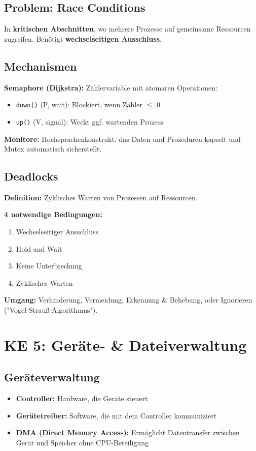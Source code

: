\documentclass[9pt,a4paper]{extarticle}
\begin{document}
\begin{multicols*}{2}
\subsection{Problem: Race Conditions}
In \textbf{kritischen Abschnitten}, wo mehrere Prozesse auf gemeinsame Ressourcen zugreifen. Benötigt \textbf{wechselseitigen Ausschluss}.

\subsection{Mechanismen}
\textbf{Semaphore (Dijkstra):} Zählervariable mit atomaren Operationen:
\begin{itemize}
\item \texttt{down()} (P, wait): Blockiert, wenn Zähler $\leq$ 0
\item \texttt{up()} (V, signal): Weckt ggf. wartenden Prozess
\end{itemize}

\textbf{Monitore:} Hochsprachenkonstrukt, das Daten und Prozeduren kapselt und Mutex automatisch sicherstellt.

\subsection{Deadlocks}
\textbf{Definition:} Zyklisches Warten von Prozessen auf Ressourcen.

\textbf{4 notwendige Bedingungen:}
\begin{enumerate}
\item Wechselseitiger Ausschluss
\item Hold and Wait
\item Keine Unterbrechung
\item Zyklisches Warten
\end{enumerate}

\textbf{Umgang:} Verhinderung, Vermeidung, Erkennung \& Behebung, oder Ignorieren ("Vogel-Strauß-Algorithmus").

\section{KE 5: Geräte- \& Dateiverwaltung}

\subsection{Geräteverwaltung}
\begin{itemize}
\item \textbf{Controller:} Hardware, die Geräte steuert
\item \textbf{Gerätetreiber:} Software, die mit dem Controller kommuniziert
\item \textbf{DMA (Direct Memory Access):} Ermöglicht Datentransfer zwischen Gerät und Speicher ohne CPU-Beteiligung
\end{itemize}


\end{multicols*}
\end{document}

